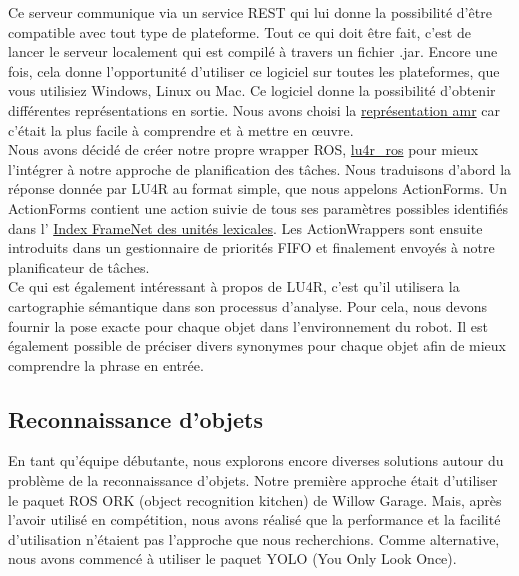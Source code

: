 \documentclass[runningheads,a4paper]{llncs}
\begin{document}
Ce serveur communique via un service REST qui lui donne la possibilité d'être compatible avec tout type de plateforme. Tout ce qui doit être fait, c'est de lancer le serveur localement qui est compilé à travers un fichier .jar. Encore une fois, cela donne l'opportunité d'utiliser ce logiciel sur toutes les plateformes, que vous utilisiez Windows, Linux ou Mac. Ce logiciel donne la possibilité d'obtenir différentes représentations en sortie. Nous avons choisi la \href{https://github.com/amrisi/amr-guidelines/blob/master/amr.md}{représentation amr} car c'était la plus facile à comprendre et à mettre en œuvre. \\

Nous avons décidé de créer notre propre wrapper ROS, \href{https://github.com/WalkingMachine/lu4r_ros}{lu4r\_ros} pour mieux l'intégrer à notre approche de planification des tâches. Nous traduisons d'abord la réponse donnée par LU4R au format simple, que nous appelons ActionForms. Un ActionForms contient une action suivie de tous ses paramètres possibles identifiés dans l' \href{https://framenet2.icsi.berkeley.edu/fnReports/data/luIndex.xml}{Index FrameNet des unités lexicales}. Les ActionWrappers sont ensuite introduits dans un gestionnaire de priorités FIFO et finalement envoyés à notre planificateur de tâches. \\

Ce qui est également intéressant à propos de LU4R, c'est qu'il utilisera la cartographie sémantique dans son processus d'analyse. Pour cela, nous devons fournir la pose exacte pour chaque objet dans l'environnement du robot. Il est également possible de préciser divers synonymes pour chaque objet afin de mieux comprendre la phrase en entrée. \\


\subsection{Reconnaissance d'objets}

En tant qu'équipe débutante, nous explorons encore diverses solutions autour du problème de la reconnaissance d'objets. Notre première approche était d'utiliser le paquet ROS ORK (object recognition kitchen) de Willow Garage. Mais, après l'avoir utilisé en compétition, nous avons réalisé que la performance et la facilité d'utilisation n'étaient pas l'approche que nous recherchions. Comme alternative, nous avons commencé à utiliser le paquet YOLO \cite{yolo} (You Only Look Once). \\
\end{document}
